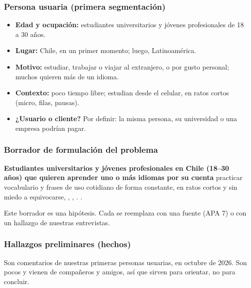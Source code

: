 \subsubsection{Persona usuaria (primera segmentación)}
\begin{hipotesis}
\begin{itemize}
  \item \textbf{Edad y ocupación:} estudiantes universitarios y jóvenes profesionales de 18 a 30 años.
  \item \textbf{Lugar:} Chile, en un primer momento; luego, Latinoamérica.
  \item \textbf{Motivo:} estudiar, trabajar o viajar al extranjero, o por gusto personal; muchos quieren más de un idioma.
  \item \textbf{Contexto:} poco tiempo libre; estudian desde el celular, en ratos cortos (micro, filas, pausas).
  \item \textbf{¿Usuario o cliente?} Por definir: la misma persona, su universidad o una empresa podrían pagar.
\end{itemize}
\end{hipotesis}

\subsubsection{Borrador de formulación del problema}
\begin{formulacion}
\textbf{Estudiantes universitarios y jóvenes profesionales en Chile (18–30 años) que quieren aprender uno o más idiomas por su cuenta}
 practicar vocabulario y frases de uso cotidiano de forma constante, en ratos cortos y sin miedo a equivocarse,
 ,
 ,
 .
\conector{[Insight]} .
\end{formulacion}

\noindent Este borrador es una hipótesis. Cada  se reemplaza con una fuente (APA 7) o
con un hallazgo de nuestras entrevistas.

\subsubsection{Hallazgos preliminares (hechos)}
Son comentarios de nuestras primeras personas usuarias, en octubre de 2026. Son pocos y vienen de
compañeros y amigos, así que sirven para orientar, no para concluir.

